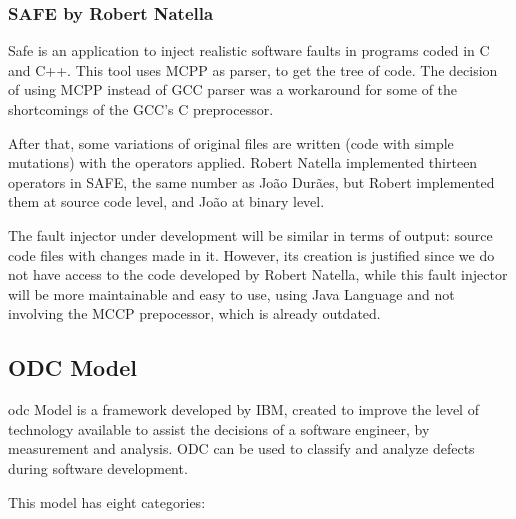 \subsubsection{SAFE by Robert Natella}

Safe is an application to inject realistic software faults in programs coded in C and C++.
This tool uses MCPP as parser, to get the tree of code. The decision of using MCPP instead of GCC parser was a workaround for some of the shortcomings of the GCC's C preprocessor.

After that, some variations of original files are written (code with simple mutations) with the operators applied.
Robert Natella implemented thirteen operators in SAFE, the same number as João Durães\cite{duraes2006emulation}, but Robert implemented them at source code level, and João at binary level.

The fault injector under development will be similar in terms of output: source code files with changes made in it. However, its creation is justified since we do not have access to the code developed by Robert Natella, while this fault injector will be more maintainable and easy to use, using Java Language and not involving the MCCP prepocessor, which is already outdated.\\


\clearpage
\subsection{ODC Model}
\acl{odc}\cite{bridge1998orthogonal} Model is a framework developed by IBM\cite{chillarege2004orthogonal}, created to improve the level of technology available to assist the decisions of a software engineer, by measurement and analysis.
ODC can be used to classify and analyze defects during software development.

This model has eight categories:

